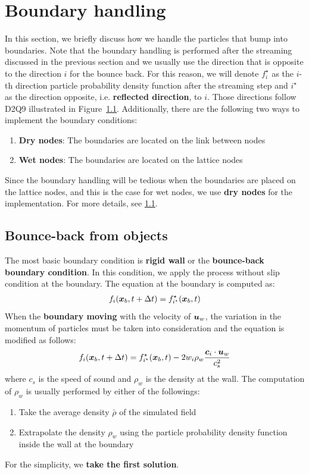 \section{Boundary handling}
In this section, we briefly discuss how we handle
the particles that bump into boundaries.
Note that the boundary handling is performed
after the streaming discussed in the previous section
and we usually use the direction that is opposite to
the direction $i$ for the bounce back.
For this reason, we will denote
$f^\star_i$ as the $i$-th direction
particle probability density function
after the streaming step
and $i^\star$ as the direction opposite,
i.e. {\bf reflected direction}, to $i$.
Those directions follow D2Q9 illustrated
in Figure~\ref{}.
Additionally, there are the following
two ways to
implement the boundary conditions:
\begin{enumerate}
  \item {\bf Dry nodes}:
  The boundaries are located on the link between nodes
  \item {\bf Wet nodes}:
  The boundaries are located on the lattice nodes
\end{enumerate}
Since the boundary handling will be tedious when
the boundaries are placed on the lattice nodes,
and this is the case for wet nodes,
we use {\bf dry nodes} for the implementation.
For more details, see \ref{}.

\subsection{Bounce-back from objects}
The most basic boundary condition is 
{\bf rigid wall} or the {\bf bounce-back boundary condition}.
In this condition, we apply the process without
slip condition at the boundary.
The equation at the boundary is computed as\cite{}:
\begin{equation}
\begin{aligned}
  f_i(\boldsymbol{x}_b, t + \Delta t) = f_{i^\star}^\star(\boldsymbol{x}_b, t)
\end{aligned}
\end{equation}
When the {\bf boundary moving} with the velocity of
$\boldsymbol{u}_w$, the variation in the momentum of particles
must be taken into consideration and the equation is
modified as follows\cite{}:
\begin{equation}
  \begin{aligned}
    f_i(\boldsymbol{x}_b, t + \Delta t) = f_{i^\star}^\star (\boldsymbol{x}_b, t) - 
    2 w_i \rho_w \frac{
      \boldsymbol{c}_i \cdot \boldsymbol{u}_w
    }{c_s^2}
  \end{aligned}
  \end{equation}
where $c_s$ is the speed of sound and 
$\rho_w$ is the density at the wall.
The computation of $\rho_w$ is usually performed by
either of the followings\cite{}:
\begin{enumerate}
  \item Take the average density $\bar{\rho}$ of the simulated field
  \item Extrapolate the density $\rho_w$ using 
  the particle probability density function inside the wall at the boundary 
\end{enumerate}
For the simplicity, we {\bf take the first solution}.

